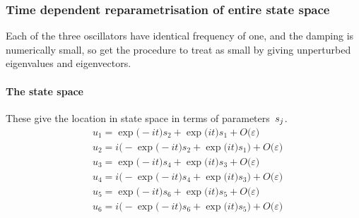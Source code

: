 \subsubsection{Time dependent reparametrisation of entire state space}
Each of the three oscillators have identical frequency of one, and the  damping is numerically small, so get the procedure to treat as small by giving unperturbed eigenvalues and eigenvectors.

\paragraph{The state space}
These give the location in state space in
terms of parameters~\(s\sb j\).
\begin{align*}&
u_{1}=\exp \big(-i t\big) s_{2}+\exp \big(i t\big) s_{1}+O\big(
\varepsilon \big)
\\&
u_{2}=i \big(-\exp \big(-i t\big) s_{2}+\exp \big(i t\big) s_{1}\big)+O
\big(\varepsilon \big)
\\&
u_{3}=\exp \big(-i t\big) s_{4}+\exp \big(i t\big) s_{3}+O\big(
\varepsilon \big)
\\&
u_{4}=i \big(-\exp \big(-i t\big) s_{4}+\exp \big(i t\big) s_{3}\big)+O
\big(\varepsilon \big)
\\&
u_{5}=\exp \big(-i t\big) s_{6}+\exp \big(i t\big) s_{5}+O\big(
\varepsilon \big)
\\&
u_{6}=i \big(-\exp \big(-i t\big) s_{6}+\exp \big(i t\big) s_{5}\big)+O
\big(\varepsilon \big)
\end{align*}

